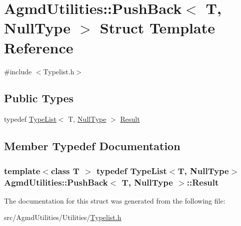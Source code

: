 \hypertarget{struct_agmd_utilities_1_1_push_back_3_01_t_00_01_null_type_01_4}{\section{Agmd\+Utilities\+:\+:Push\+Back$<$ T, Null\+Type $>$ Struct Template Reference}
\label{struct_agmd_utilities_1_1_push_back_3_01_t_00_01_null_type_01_4}
}


{\ttfamily \#include $<$Typelist.\+h$>$}

\subsection*{Public Types}
\begin{DoxyCompactItemize}
\item 
typedef \hyperlink{struct_agmd_utilities_1_1_type_list}{Type\+List}$<$ T, \hyperlink{struct_agmd_utilities_1_1_null_type}{Null\+Type} $>$ \hyperlink{struct_agmd_utilities_1_1_push_back_3_01_t_00_01_null_type_01_4_a410a1919aff187d8439df51cb4ccdc5c}{Result}
\end{DoxyCompactItemize}


\subsection{Member Typedef Documentation}
\hypertarget{struct_agmd_utilities_1_1_push_back_3_01_t_00_01_null_type_01_4_a410a1919aff187d8439df51cb4ccdc5c}{
\subsubsection[{Result}]{\setlength{\rightskip}{0pt plus 5cm}template$<$class T $>$ typedef {\bf Type\+List}$<$T, {\bf Null\+Type}$>$ {\bf Agmd\+Utilities\+::\+Push\+Back}$<$ T, {\bf Null\+Type} $>$\+::{\bf Result}}}\label{struct_agmd_utilities_1_1_push_back_3_01_t_00_01_null_type_01_4_a410a1919aff187d8439df51cb4ccdc5c}


The documentation for this struct was generated from the following file\+:\begin{DoxyCompactItemize}
\item 
src/\+Agmd\+Utilities/\+Utilities/\hyperlink{_typelist_8h}{Typelist.\+h}\end{DoxyCompactItemize}
